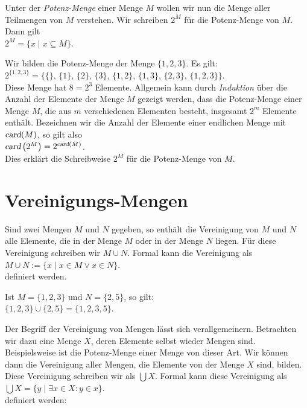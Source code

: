 Unter der \emph{Potenz-Menge} einer Menge $M$ wollen wir nun die Menge aller Teilmengen
von $M$ verstehen.  Wir schreiben $2^M$ f\"{u}r die Potenz-Menge von $M$.  Dann gilt \\[0.2cm]
\hspace*{1.3cm} $2^M = \{ x \;|\; x \subseteq M \}$.
\vspace{0.2cm}

\example
Wir bilden  die Potenz-Menge der Menge $\{1,2,3\}$.  Es gilt: \\[0.2cm]
\hspace*{1.3cm} $2^{\{1,2,3\}} = \big\{ \{\},\, \{1\}, \, \{2\},\, \{3\},\, \{1,2\}, \, \{1,3\}, \, \{2,3\},\, \{1,2,3\}\big\}$. \\[0.2cm]
Diese Menge hat $8 = 2^3$ Elemente.  Allgemein kann durch \emph{Induktion} \"{u}ber die Anzahl der
Elemente der Menge $M$ gezeigt werden, dass die 
Potenz-Menge einer Menge $M$, die aus $m$ verschiedenen Elementen besteht, insgesamt $2^m$ 
Elemente enth\"{a}lt.  Bezeichnen wir die Anzahl der Elemente einer endlichen Menge mit
$\textsl{card}(M)$, so gilt also
\\[0.2cm]
\hspace*{1.3cm}
$\textsl{card}\left(2^M\right) = 2^{\textsl{card}(M)}$.
\\[0.2cm]
Dies erkl\"{a}rt die Schreibweise $2^M$ f\"{u}r die Potenz-Menge von $M$.  \eox

\section{Vereinigungs-Mengen}
Sind zwei Mengen $M$ und $N$ gegeben, so enth\"{a}lt die Vereinigung von $M$ und $N$ alle Elemente, die 
 in der Menge $M$ oder in der Menge $N$ liegen.  F\"{u}r diese Vereinigung schreiben wir $M \cup N$.
Formal kann die Vereinigung als 
\\[0.2cm]
\hspace*{1.3cm} $M \cup N := \{ x \;|\; x \in M \vee x \in N \}$. 
\\[0.2cm] 
definiert werden.


\example 
Ist  $M = \{1,2,3\}$ und $N = \{2,5\}$, so gilt: \\[0.2cm]
\hspace*{1.3cm} $\{1,2,3\} \cup \{2,5\} = \{1,2,3,5\}$.  \eox


Der Begriff der Vereinigung von Mengen l\"{a}sst sich verallgemeinern.  Betrachten
wir dazu eine Menge $X$, deren Elemente selbst wieder Mengen sind. Beispielsweise ist die Potenz-Menge 
einer Menge von dieser Art.  Wir k\"{o}nnen dann die Vereinigung aller Mengen, die Elemente
von der Menge $X$ sind, bilden.  Diese Vereinigung schreiben wir als $\bigcup X$.  Formal
kann diese Vereinigung als
\\[0.2cm]
\hspace*{1.3cm} $\bigcup X = \{ y \;|\; \exists x \in X: y \in x \}$.
\\[0.2cm]
 definiert werden:


